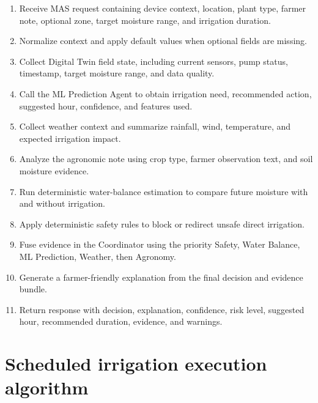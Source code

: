 \begin{enumerate}

\item Receive MAS request containing device context, location, plant type, farmer note, optional zone, target moisture range, and irrigation duration.

\item Normalize context and apply default values when optional fields are missing.

\item Collect Digital Twin field state, including current sensors, pump status, timestamp, target moisture range, and data quality.

\item Call the ML Prediction Agent to obtain irrigation need, recommended action, suggested hour, confidence, and features used.

\item Collect weather context and summarize rainfall, wind, temperature, and expected irrigation impact.

\item Analyze the agronomic note using crop type, farmer observation text, and soil moisture evidence.

\item Run deterministic water-balance estimation to compare future moisture with and without irrigation.

\item Apply deterministic safety rules to block or redirect unsafe direct irrigation.

\item Fuse evidence in the Coordinator using the priority Safety, Water Balance, ML Prediction, Weather, then Agronomy.

\item Generate a farmer-friendly explanation from the final decision and evidence bundle.

\item Return response with decision, explanation, confidence, risk level, suggested hour, recommended duration, evidence, and warnings.

\end{enumerate}

\section{Scheduled irrigation execution algorithm}

